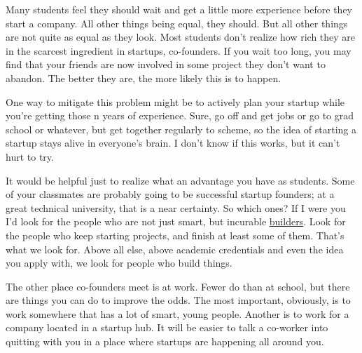 \documentclass[12pt]{book}
\begin{document}
Many students feel they should wait and get a little more experience
before they start a company. All other things being equal, they should.
But all other things are not quite as equal as they look. Most students
don't realize how rich they are in the scarcest ingredient in startups,
co-founders. If you wait too long, you may find that your friends are
now involved in some project they don't want to abandon. The better they
are, the more likely this is to happen.

One way to mitigate this problem might be to actively plan your startup
while you're getting those n years of experience. Sure, go off and get
jobs or go to grad school or whatever, but get together regularly to
scheme, so the idea of starting a startup stays alive in everyone's
brain. I don't know if this works, but it can't hurt to try.

It would be helpful just to realize what an advantage you have as
students. Some of your classmates are probably going to be successful
startup founders; at a great technical university, that is a near
certainty. So which ones? If I were you I'd look for the people who are
not just smart, but incurable
\href{http://my-computer.cruftlabs.com:8080/photos/motorcouch/0067.html}{builders}.
Look for the people who keep starting projects, and finish at least some
of them. That's what we look for. Above all else, above academic
credentials and even the idea you apply with, we look for people who
build things.

The other place co-founders meet is at work. Fewer do than at school,
but there are things you can do to improve the odds. The most important,
obviously, is to work somewhere that has a lot of smart, young people.
Another is to work for a company located in a startup hub. It will be
easier to talk a co-worker into quitting with you in a place where
startups are happening all around you.
\end{document}
